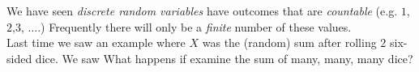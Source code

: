 \documentclass[10pt]{article}
\begin{document}
\minil
We have seen {\em discrete random variables} have outcomes that are {\em countable}  (e.g. $1$,$2$,$3$, $\dots$.) Frequently there will only be a {\em finite} number of these values.\\
 Last time we saw an example where $X$ was the (random) sum after rolling $2$ six-sided dice. We saw
What happens if examine the sum of  many, many, many dice?
~\\
\end{document}
